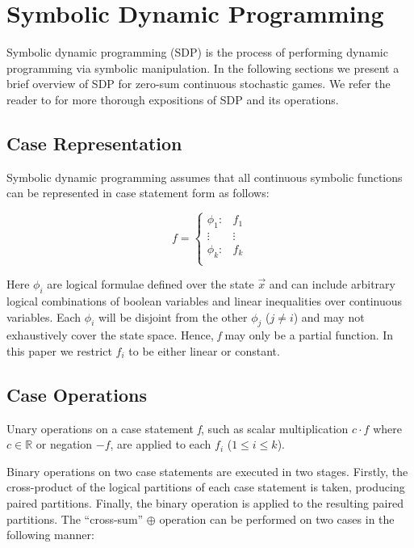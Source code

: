 \section{Symbolic Dynamic Programming}
\label{sec:sdp}

Symbolic dynamic programming (SDP) \cite{Boutilier_IJCAI_2001} is 
the process of performing dynamic programming via symbolic 
manipulation. In the following sections we present a brief overview
of SDP for zero-sum continuous stochastic games. We refer the reader
to \cite{Sanner_UAI_2011,Zamani_AAAI_2012} for more thorough 
expositions of SDP and its operations.

\subsection{Case Representation}

Symbolic dynamic programming assumes that all continuous symbolic 
functions can be represented in case statement form \cite{Boutilier_IJCAI_2001} as follows:

{\small 
\begin{equation*}
  f = 
    \begin{cases}
      \phi_1: & f_1 \\ 
      \vdots & \vdots\\ 
      \phi_k: & f_k \\ 
    \end{cases} \nonumber
\end{equation*}
}%

Here $\phi_i$ are logical formulae defined over the state $\vec{x}$ 
and can include arbitrary logical combinations of boolean variables and 
linear inequalities over continuous variables. Each $\phi_i$ will be 
disjoint from the other $\phi_j$ ($j \neq i$) and may not 
exhaustively cover the state space. Hence, \emph{f} may only be a 
partial function. In this paper we restrict $f_i$ to be either linear or constant.

\subsection{Case Operations}

Unary operations on a case statement \emph{f}, such as scalar 
multiplication $c \cdot f$ where $ c \in \mathbb{R} $ or negation $-f$,
are applied to each $f_i$ ($1 \leq i \leq k$). 

Binary operations on two case statements are executed in two stages.
Firstly, the cross-product of the logical partitions of each case statement 
is taken, producing paired partitions. Finally, the binary operation 
is applied to the resulting paired partitions. The ``cross-sum'' $\oplus$
operation can be performed on two cases in the following manner:

